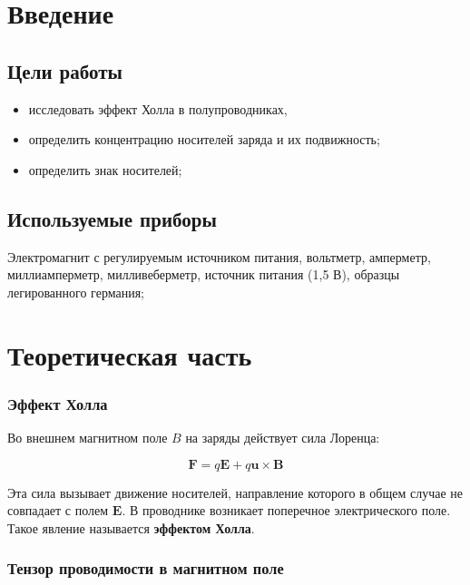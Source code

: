 \section{Введение}

\subsection{Цели работы}

\begin{itemize}
    \item исследовать эффект Холла в полупроводниках,
    \item определить концентрацию носителей заряда и их подвижность;
    \item определить знак носителей;
\end{itemize}

\subsection{Используемые приборы}

    Электромагнит с регулируемым источником питания, вольтметр, амперметр, миллиамперметр, милливеберметр, источник питания (1,5 В), образцы легированного германия;

\newpage

\section{Теоретическая часть}

\subsubsection{Эффект Холла}

Во внешнем магнитном поле \( B \) на заряды действует сила Лоренца:

\begin{equation}
\mathbf{F} = q\mathbf{E} + q\mathbf{u} \times \mathbf{B}
\end{equation}

Эта сила вызывает движение носителей, направление которого в общем случае не совпадает с полем \( \mathbf{E} \). В проводнике возникает поперечное электрического поле. Такое явление называется \textbf{эффектом Холла}.

\subsubsection{Тензор проводимости в магнитном поле}

